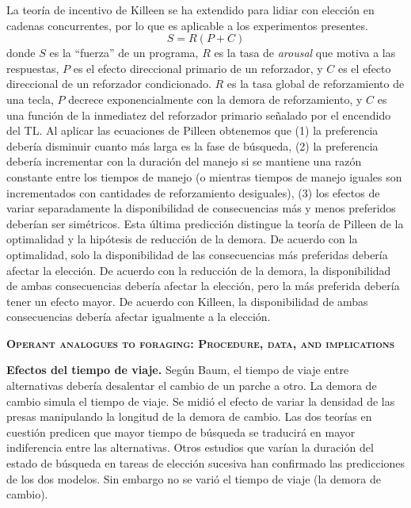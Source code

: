 \documentclass[a4paper,12pt]{article}
\begin{document}
La teoría de incentivo de Killeen se ha extendido para lidiar con elección en cadenas concurrentes, por lo que es aplicable a los experimentos presentes.
\begin{equation}
	S = R(P + C)
\end{equation}
donde $S$ es la ``fuerza'' de un programa, $R$ es la tasa de {\itshape arousal} que motiva a las respuestas, $P$ es el efecto direccional primario de un reforzador, y $C$ es el efecto direccional de un reforzador condicionado.  $R$ es la tasa global de reforzamiento de una tecla, $P$ decrece exponencialmente con la demora de reforzamiento, y $C$ es una función de la inmediatez del reforzador primario señalado por el encendido del TL. Al aplicar las ecuaciones de Pilleen obtenemos que (1) la preferencia debería disminuir cuanto más larga es la fase de búsqueda, (2) la preferencia debería incrementar con la duración del manejo si se mantiene una razón constante entre los tiempos de manejo (o mientras tiempos de manejo iguales son incrementados con cantidades de reforzamiento desiguales), (3) los efectos de variar separadamente la disponibilidad de consecuencias más y menos preferidos deberían ser simétricos. Esta última predicción distingue la teoría de Pilleen de la optimalidad y la hipótesis de reducción de la demora. De acuerdo con la optimalidad, solo la disponibilidad de las consecuencias más preferidas debería afectar la elección. De acuerdo con la reducción de la demora, la disponibilidad de ambas consecuencias debería afectar la elección, pero la más preferida debería tener un efecto mayor. De acuerdo con Killeen, la disponibilidad de ambas consecuencias debería afectar igualmente a la elección.

{\scshape\bfseries Operant analogues to foraging: Procedure, data, and implications}

{\bfseries Efectos del tiempo de viaje.}  Según Baum, el tiempo de viaje entre alternativas debería desalentar el cambio de un parche a otro. La demora de cambio simula el tiempo de viaje. Se midió el efecto de variar la densidad de las presas manipulando la longitud de la demora de cambio. Las dos teorías en cuestión predicen que mayor tiempo de búsqueda se traducirá en mayor indiferencia entre las alternativas. Otros estudios que varían la duración del estado de búsqueda en tareas de elección sucesiva han confirmado las predicciones de los dos modelos. Sin embargo no se varió el tiempo de viaje (la demora de cambio). 
\end{document}
